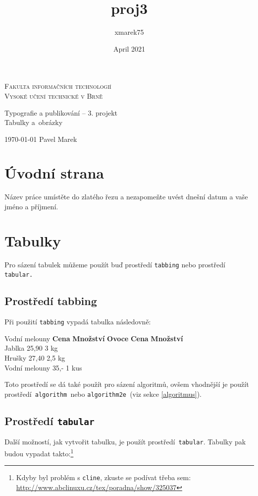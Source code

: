 \documentclass[a4paper, 11pt]{article}
\title{proj3}
\author{xmarek75}
\date{April 2021}
\begin{document}
\begin{titlepage}

\begin{center}
\Huge
\textsc{Fakulta informačních technologií\\
Vysoké učení technické v Brně} \\

\LARGE
Typografie a publikování -- 3. projekt \\
\Huge
Tabulky a~obrázky
\end{center}

{\Large \today \hfill
Pavel Marek }
\end{titlepage}
\section{Úvodní strana}
Název práce umístěte do zlatého řezu a nezapomeňte uvést dnešní datum a vaše jméno a příjmení.
\section{Tabulky}
Pro sázení tabulek můžeme použít buď prostředí \verb|tabbing| nebo prostředí \verb|tabular.|
\subsection{Prostředí tabbing}
Při použití \verb|tabbing| vypadá tabulka následovně:
\begin{tabbing}
Vodní melouny \quad	\= \textbf{Cena} \quad	\= \textbf{Množství}	\kill 
\textbf{Ovoce} \> \textbf{Cena} \> \textbf{Množství}\\
{Jablka} \> {25,90} \> {3 kg}\\
{Hrušky} \> {27,40} \> {2,5 kg}\\
{Vodní melouny} \> {35,-} \> {1 kus}\\

\end{tabbing}
Toto prostředí se dá také použít pro sázení algoritmů, ovšem vhodnější je použít prostředí\texttt{ algorithm }nebo \texttt{algorithm2e }(viz sekce \ref{algoritmus}).

\subsection{Prostředí \texttt{tabular}}
Další možností, jak vytvořit tabulku, je použít prostředí\texttt{ tabular}. Tabulky pak 
budou vypadat takto:\footnote{Kdyby byl problém s \texttt{cline}, zkuste se podívat třeba sem: \href{http://www.abclinuxu.cz/tex/poradna/show/325037}{http://www.abclinuxu.cz/tex/poradna/show/325037}}\\
\end{document}
